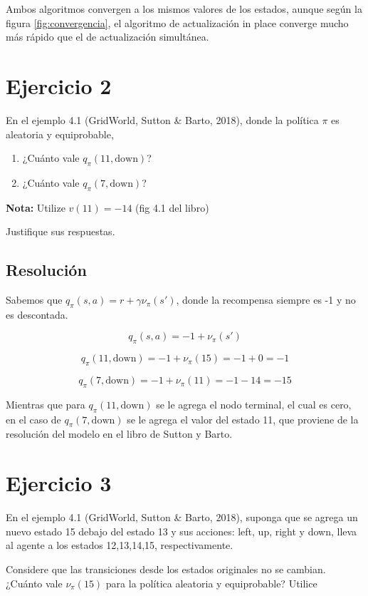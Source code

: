 \documentclass[12pt,a4paper]{article}
\begin{document}
Ambos algoritmos convergen a los mismos valores de los estados, aunque según
la figura \ref{fig:convergencia}, el algoritmo de actualización in place
converge mucho más rápido que el de actualización simultánea.


\section{Ejercicio 2}

En el ejemplo 4.1 (GridWorld, Sutton \& Barto, 2018), donde la política $\pi$ es aleatoria y equiprobable,

\begin{enumerate}
  \item ¿Cuánto vale $ q_\pi(11, \text{down})$?
  \item ¿Cuánto vale $ q_\pi(7, \text{down})$?    
\end{enumerate}

\textbf{Nota:} Utilize $ v(11) = -14$ (fig 4.1 del libro)

Justifique sus respuestas.

\subsection{Resolución}

Sabemos que $q_\pi(s,a) = r + \gamma\nu_\pi(s')$, donde la recompensa siempre es -1
y no es descontada.

$$ q_\pi(s,a) = -1 + \nu_\pi(s') $$

$$ q_\pi(11,\text{down}) = -1 + \nu_\pi(15) = -1 + 0 = -1 $$

$$ q_\pi(7,\text{down}) = -1 + \nu_\pi(11) = -1 - 14 = -15 $$

Mientras que para $q_\pi(11,\text{down})$ se le agrega el nodo terminal,
el cual es cero, en el caso de $q_\pi(7,\text{down})$ se le agrega el valor
del estado 11, que proviene de la resolución del modelo en el libro
de Sutton y Barto.

\section{Ejercicio 3}

En el ejemplo 4.1 (GridWorld, Sutton \& Barto, 2018), suponga que se agrega un nuevo estado 15 debajo
del estado 13 y sus acciones: left, up, right y down, lleva al agente a los estados 12,13,14,15, respectivamente.

Considere que las transiciones desde los estados originales no se cambian. ¿Cuánto vale $\nu_\pi(15)$ para la 
política aleatoria y equiprobable? Utilice
\end{document}
